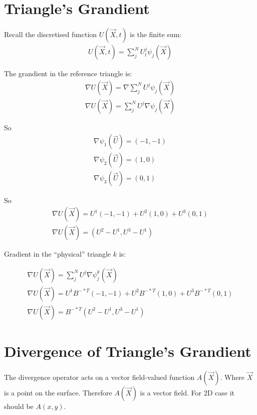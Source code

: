 \documentclass{birkjour}
\numberwithin{equation}{section}
\begin{document}
\section{Triangle's Grandient}

Recall the discretised function $U(\vec X, t)$ is the finite sum:
\begin{eqnarray}
	U(\vec X, t) = \sum_j^N{ U_t^j \psi_j(\vec X) } \nonumber
\end{eqnarray}

The grandient in the reference triangle is:
\begin{eqnarray}
	\nabla U(\vec X) = \nabla \sum_j^N{ U^j \psi_j(\vec X) } \nonumber\\
	\nabla U(\vec X) = \sum_j^N{ U^j \nabla \psi_j(\vec X) } \nonumber
\end{eqnarray}

So
\begin{eqnarray}
	\nabla \psi_1(\vec U) = (-1, -1) \nonumber\\
	\nabla \psi_2(\vec U) = (1, 0) \nonumber\\
	\nabla \psi_3(\vec U) = (0, 1) \nonumber
\end{eqnarray}

So
\begin{eqnarray}
	\nabla U(\vec X) = U^1 (-1, -1) + U^2 (1, 0) + U^3 (0, 1) \nonumber\\
	\nabla U(\vec X) = (U^2 - U^1, U^3 - U^1) \nonumber
\end{eqnarray}

Gradient in the ``physical'' triangle $k$ is:
 
\begin{eqnarray}
	\nabla U(\vec X) = \sum_j^N{ U^j \nabla \psi^k_j(\vec X) } \nonumber\\
	\nabla U(\vec X) = U^1 B^{-*T} (-1, -1) + U^2 B^{-*T} (1, 0) + U^3 B^{-*T} (0, 1) \nonumber\\
	\nabla U(\vec X) = B^{-*T} (U^2 - U^1, U^3 - U^1) \nonumber
\end{eqnarray}

\section{Divergence of Triangle's Grandient}


The divergence operator acts on a vector field-valued function $A(\vec X)$. Where $\vec X$ is a point on the surface.
Therefore $A(\vec X)$ is a vector field. For 2D case it should be $A(x,y)$.
\end{document}
